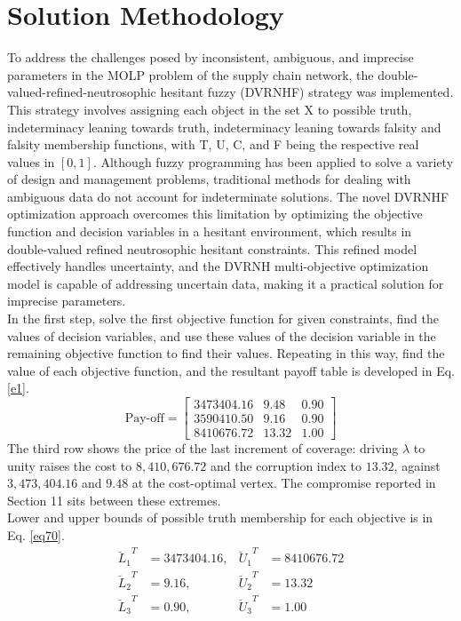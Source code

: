\documentclass[a4paper]{elsarticle}
\begin{document}
{\section{Solution Methodology}
\label{s6}
\noindent To address the challenges posed by inconsistent, ambiguous, and imprecise parameters in the MOLP problem of the supply chain network, the double-valued-refined-neutrosophic hesitant fuzzy (DVRNHF) strategy was implemented. This strategy involves assigning each object in the set X to possible truth, indeterminacy leaning towards truth, indeterminacy leaning towards falsity and falsity membership functions, with T, U, C, and F being the respective real values in $[0, 1]$. Although fuzzy programming has been applied to solve a variety of design and management problems, traditional methods for dealing with ambiguous data do not account for indeterminate solutions. The novel DVRNHF optimization approach overcomes this limitation by optimizing the objective function and decision variables in a hesitant environment, which results in double-valued refined neutrosophic hesitant constraints. This refined model effectively handles uncertainty, and the DVRNH multi-objective optimization model is capable of addressing uncertain data, making it a practical solution for imprecise parameters.\\
In the first step, solve the first objective function for given constraints, find the values of decision variables, and use these values of the decision variable in the remaining objective function to find their values. Repeating in this way, find the value of each objective function, and the resultant payoff table is developed in Eq. \ref{e1}.
\begin{equation}\label{e1}
\text{Pay-off} = \begin{bmatrix}
3473404.16 & 9.48 & 0.90 \\
3590410.50 & 9.16 & 0.90 \\
8410676.72 & 13.32 & 1.00
\end{bmatrix}
\end{equation}
The third row shows the price of the last increment of coverage: driving $\lambda$ to unity raises the cost to $8,410,676.72$ and the corruption index to $13.32$, against $3,473,404.16$ and $9.48$ at the cost-optimal vertex. The compromise reported in Section 11 sits between these extremes.\\
\noindent Lower and upper bounds of possible truth membership for each objective is in Eq. \ref{eq70}.
\begin{equation}
\label{eq70}
\begin{aligned}
{\breve{L}_1}^{T} &= 3473404.16, & {\breve{U}_1}^{T} &= 8410676.72 \\
{\breve{L}_2}^{T} &= 9.16,       & {\breve{U}_2}^{T} &= 13.32 \\
{\breve{L}_3}^{T} &= 0.90,       & {\breve{U}_3}^{T} &= 1.00
\end{aligned}
\end{equation}

}
\end{document}
